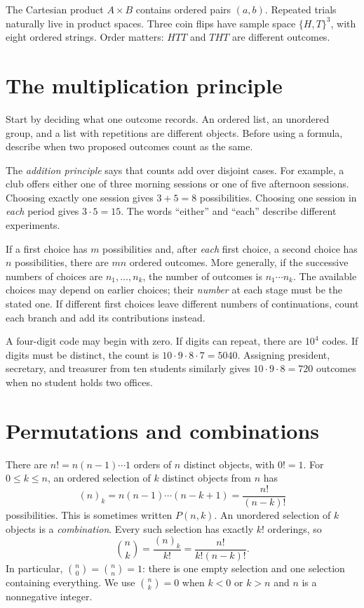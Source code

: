 The Cartesian product $A\times B$ contains ordered pairs $(a,b)$. Repeated trials naturally live in product spaces. Three coin flips have sample space $\{H,T\}^3$, with eight ordered strings. Order matters: $HTT$ and $THT$ are different outcomes.

\section{The multiplication principle}

Start by deciding what one outcome records. An ordered list, an unordered
group, and a list with repetitions are different objects. Before using a
formula, describe when two proposed outcomes count as the same.

The \emph{addition principle} says that counts add over disjoint cases.
For example, a club offers either one of three morning sessions or one of
five afternoon sessions. Choosing exactly one session gives $3+5=8$
possibilities. Choosing one session in \emph{each} period gives $3\cdot5=15$.
The words ``either'' and ``each'' describe different experiments.

If a first choice has $m$ possibilities and, after \emph{each} first choice,
a second choice has $n$ possibilities, there are $mn$ ordered outcomes.
More generally, if the successive numbers of choices are $n_1,\ldots,n_k$,
the number of outcomes is $n_1\cdots n_k$. The available choices may depend
on earlier choices; their \emph{number} at each stage must be the stated one.
If different first choices leave different numbers of continuations, count
each branch and add its contributions instead.

\begin{example}
A four-digit code may begin with zero. If digits can repeat, there are
$10^4$ codes. If digits must be distinct, the count is
$10\cdot9\cdot8\cdot7=5040$. Assigning president, secretary, and treasurer
from ten students similarly gives $10\cdot9\cdot8=720$ outcomes when no
student holds two offices.
\end{example}

\section{Permutations and combinations}

There are $n!=n(n-1)\cdots1$ orders of $n$ distinct objects, with $0!=1$.
For $0\le k\le n$, an ordered selection of $k$ distinct objects from $n$
has
\[
  (n)_k=n(n-1)\cdots(n-k+1)=\frac{n!}{(n-k)!}
\]
possibilities. This is sometimes written $P(n,k)$. An unordered selection
of $k$ objects is a \emph{combination}. Every such selection has exactly
$k!$ orderings, so
\[
  \binom nk=\frac{(n)_k}{k!}=\frac{n!}{k!(n-k)!}.
\]
In particular, $\binom n0=\binom nn=1$: there is one empty selection and
one selection containing everything. We use $\binom nk=0$ when $k<0$ or
$k>n$ and $n$ is a nonnegative integer.

